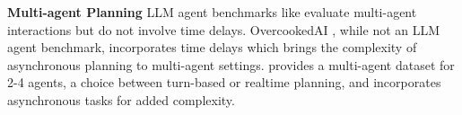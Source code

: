 \textbf{Multi-agent Planning} LLM agent benchmarks like \citep{liu2023agentbenchevaluatingllmsagents,xu2023magicinvestigationlargelanguage,ma2024agentboardanalyticalevaluationboard, gong2023mindagent} evaluate multi-agent interactions but do not involve time delays. OvercookedAI \citep{carroll2020utilitylearninghumanshumanai}, while not an LLM agent benchmark, incorporates time delays which brings the complexity of asynchronous planning to multi-agent settings. \robotouille{} provides a multi-agent dataset for 2-4 agents, a choice between turn-based or realtime planning, and incorporates asynchronous tasks for added complexity.